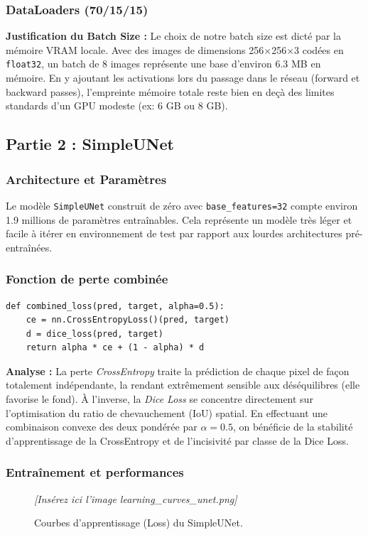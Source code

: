 \documentclass[12pt, a4paper]{article}
\begin{document}
\subsubsection*{DataLoaders (70/15/15)}
\textbf{Justification du Batch Size :} Le choix de notre batch size est dicté par la mémoire VRAM locale. Avec des images de dimensions 256×256×3 codées en \texttt{float32}, un batch de 8 images représente une base d'environ 6.3 MB en mémoire. En y ajoutant les activations lors du passage dans le réseau (forward et backward passes), l'empreinte mémoire totale reste bien en deçà des limites standards d'un GPU modeste (ex: 6 GB ou 8 GB).

\subsection{Partie 2 : SimpleUNet}

\subsubsection*{Architecture et Paramètres}
Le modèle \texttt{SimpleUNet} construit de zéro avec \texttt{base\_features=32} compte environ 1.9 millions de paramètres entraînables. Cela représente un modèle très léger et facile à itérer en environnement de test par rapport aux lourdes architectures pré-entraînées.

\subsubsection*{Fonction de perte combinée}
\begin{lstlisting}
def combined_loss(pred, target, alpha=0.5):
    ce = nn.CrossEntropyLoss()(pred, target)
    d = dice_loss(pred, target)
    return alpha * ce + (1 - alpha) * d
\end{lstlisting}

\textbf{Analyse :} La perte \textit{CrossEntropy} traite la prédiction de chaque pixel de façon totalement indépendante, la rendant extrêmement sensible aux déséquilibres (elle favorise le fond). À l'inverse, la \textit{Dice Loss} se concentre directement sur l'optimisation du ratio de chevauchement (IoU) spatial. En effectuant une combinaison convexe des deux pondérée par $\alpha=0.5$, on bénéficie de la stabilité d'apprentissage de la CrossEntropy et de l'incisivité par classe de la Dice Loss.

\subsubsection*{Entraînement et performances}
\begin{figure}[H]
    \centering
    \textit{[Insérez ici l'image learning\_curves\_unet.png]}
    \caption{Courbes d'apprentissage (Loss) du SimpleUNet.}
\end{figure}
\end{document}
